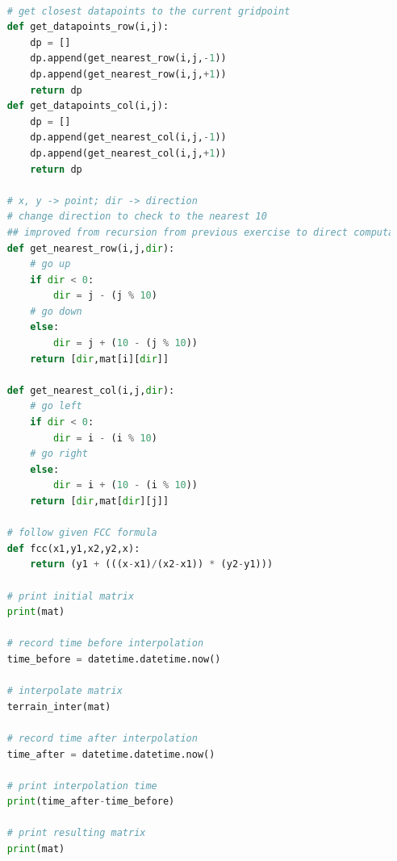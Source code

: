 \documentclass{article}
\begin{document}
\begin{lstlisting}[language=Python]
    
    # get closest datapoints to the current gridpoint
    def get_datapoints_row(i,j):
        dp = []
        dp.append(get_nearest_row(i,j,-1))
        dp.append(get_nearest_row(i,j,+1))
        return dp
    def get_datapoints_col(i,j):
        dp = []
        dp.append(get_nearest_col(i,j,-1))
        dp.append(get_nearest_col(i,j,+1))
        return dp
    
    # x, y -> point; dir -> direction 
    # change direction to check to the nearest 10
    ## improved from recursion from previous exercise to direct computation
    def get_nearest_row(i,j,dir):
        # go up
        if dir < 0:
            dir = j - (j % 10)
        # go down
        else:
            dir = j + (10 - (j % 10))
        return [dir,mat[i][dir]]
    
    def get_nearest_col(i,j,dir):
        # go left
        if dir < 0:
            dir = i - (i % 10)
        # go right
        else:
            dir = i + (10 - (i % 10))
        return [dir,mat[dir][j]]
    
    # follow given FCC formula
    def fcc(x1,y1,x2,y2,x):
        return (y1 + (((x-x1)/(x2-x1)) * (y2-y1)))
    
    # print initial matrix
    print(mat)
    
    # record time before interpolation
    time_before = datetime.datetime.now()
    
    # interpolate matrix
    terrain_inter(mat)
    
    # record time after interpolation
    time_after = datetime.datetime.now()
    
    # print interpolation time
    print(time_after-time_before)
    
    # print resulting matrix
    print(mat)
\end{lstlisting}
\end{document}
